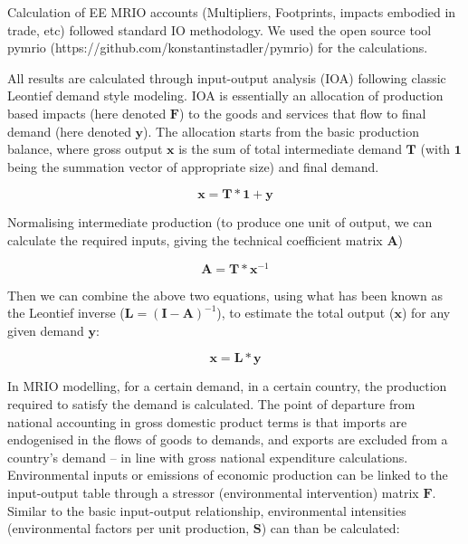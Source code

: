 Calculation of EE MRIO accounts (Multipliers, Footprints, impacts embodied in trade, etc) followed
standard IO methodology. We used the open source tool pymrio (https://github.com/konstantinstadler/pymrio) for the calculations.

All results are  calculated through input-output analysis (IOA) following classic Leontief demand style modeling. IOA is essentially an allocation of production based impacts (here denoted $\textbf{F}$) to the goods and services that flow to final demand (here denoted $\textbf{y}$). The allocation starts from the basic production balance, where gross output $\textbf{x}$ is the sum of total intermediate demand $\textbf{T}$ (with $\textbf{1}$ being the summation vector of appropriate size) and final demand. 

\begin{equation}
\textbf{x}=\textbf{T}*\textbf{1}+\textbf{y}
\end{equation}

Normalising intermediate production (to produce one unit of output, we can calculate the required inputs, giving the technical coefficient matrix $\textbf{A}$)

\begin{equation}
\textbf{A}=\textbf{T} * \textbf{x}^{-1}
\end{equation}

Then we can combine the above two equations, using what has been known as the Leontief inverse ($\textbf{L} = (\textbf{I}-\textbf{A})^{-1}$), to estimate the total output ($\textbf{x}$) for any given demand $\textbf{y}$:

\begin{equation}
\textbf{x}=\textbf{L} * \textbf{y}
\end{equation}

In MRIO modelling, for a certain demand, in a certain country, the production required to satisfy the demand is calculated. The point of departure from national accounting in gross domestic product terms is that imports are endogenised in the flows of goods to demands, and exports are excluded from a country’s demand – in line with gross national expenditure calculations. Environmental inputs or emissions of economic production can be linked to the input-output table through a stressor (environmental intervention) matrix $\textbf{F}$. Similar to the basic input-output relationship, environmental intensities (environmental factors per unit production, $\textbf{S}$) can than be calculated:

